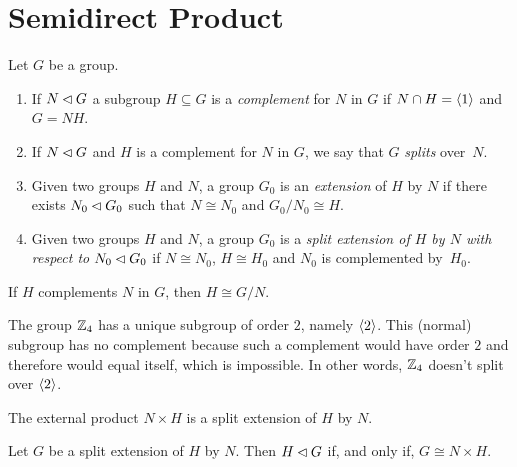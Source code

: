 \section{Semidirect Product}

\begin{defns} Let\/ $G$ be a group.
    \begin{enumerate}[\rm i)]
        \item If\/ $N\lhd G$ a subgroup\/ $H\subseteq G$ is a \textsl{complement} for\/ $N$ in\/ $G$ if\/ $N\cap H=\langle1\rangle$ and\/ $G=NH$.

        \item If\/ $N\lhd G$ and\/ $H$ is a complement for\/ $N$ in\/ $G$, we say that\/ $G$ \textsl{splits} over\/~$N$.

        \item Given two groups\/ $H$ and\/ $N$, a group\/ $G_0$ is an \textsl{extension} of\/ $H$ by\/ $N$ if there exists\/ $N_0\lhd G_0$ such that\/ $N\cong N_0$ and $G_0/N_0\cong H$.

        \item Given two groups\/ $H$ and\/ $N$, a group\/ $G_0$ is a \textsl{split extension of\/ $H$ by\/ $N$ with respect to $N_0\lhd G_0$} if\/ $N\cong N_0$, $H\cong H_0$ and\/ $N_0$ is complemented by\/~$H_0$.
    \end{enumerate}
\end{defns}

\begin{rem}
    If\/ $H$ complements\/ $N$ in\/ $G$, then $H\cong G/N$.
\end{rem}

\begin{xmpl}
    The group $\mathbb{Z}_4$ has a unique subgroup of order\/ $2$, namely $\langle2\rangle$. This (normal) subgroup has no complement because such a complement would have order\/ $2$ and therefore would equal itself, which is impossible. In other words, $\mathbb{Z}_4$ doesn't split over $\langle2\rangle$.
\end{xmpl}

\begin{rem}
    The external product\/ $N\times H$ is a split extension of\/ $H$ by\/ $N$.
\end{rem}

\begin{prop}\label{normal-complement}
    Let\/ $G$ be a split extension of\/ $H$ by\/ $N$. Then $H\lhd G$ if, and only if, $G\cong N\times H$.
\end{prop}

